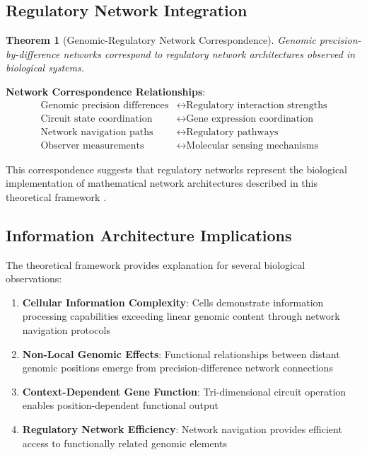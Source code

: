 \documentclass[12pt,a4paper]{article}
\newtheorem{theorem}{Theorem}
\begin{document}
\subsection{Regulatory Network Integration}

\begin{theorem}[Genomic-Regulatory Network Correspondence]
Genomic precision-by-difference networks correspond to regulatory network architectures observed in biological systems.
\end{theorem}

\textbf{Network Correspondence Relationships}:
\begin{align}
\text{Genomic precision differences} &\leftrightarrow \text{Regulatory interaction strengths} \\
\text{Circuit state coordination} &\leftrightarrow \text{Gene expression coordination} \\
\text{Network navigation paths} &\leftrightarrow \text{Regulatory pathways} \\
\text{Observer measurements} &\leftrightarrow \text{Molecular sensing mechanisms}
\end{align}

This correspondence suggests that regulatory networks represent the biological implementation of mathematical network architectures described in this theoretical framework \cite{spitz2012regulatory}.

\subsection{Information Architecture Implications}

The theoretical framework provides explanation for several biological observations:

\begin{enumerate}
\item \textbf{Cellular Information Complexity}: Cells demonstrate information processing capabilities exceeding linear genomic content through network navigation protocols
\item \textbf{Non-Local Genomic Effects}: Functional relationships between distant genomic positions emerge from precision-difference network connections
\item \textbf{Context-Dependent Gene Function}: Tri-dimensional circuit operation enables position-dependent functional output
\item \textbf{Regulatory Network Efficiency}: Network navigation provides efficient access to functionally related genomic elements
\end{enumerate}
\end{document}
